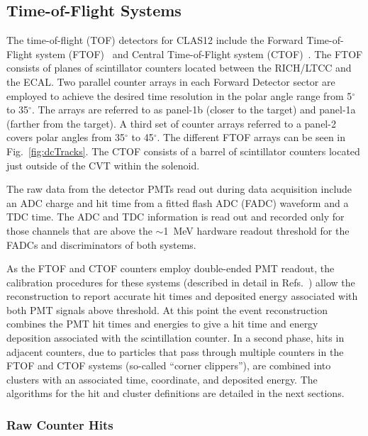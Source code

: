 \subsection{Time-of-Flight Systems}
\label{tof-sys}

The time-of-flight (TOF) detectors for CLAS12 include the Forward Time-of-Flight system (FTOF)~\cite{ftof-nim}
and Central Time-of-Flight system (CTOF)~\cite{ctof-nim}. The FTOF consists of planes of scintillator counters
located between the RICH/LTCC and the ECAL. Two parallel counter arrays in each Forward Detector sector are
employed to achieve the desired time resolution in the polar angle range from 5$^\circ$ to 35$^\circ$. The arrays are
referred to as panel-1b (closer to the target) and panel-1a (farther from the target). A third set of counter arrays
referred to a panel-2 covers polar angles from 35$^\circ$ to 45$^\circ$. The different FTOF arrays can be seen in
Fig.~\ref{fig:dcTracks}. The CTOF consists of a barrel of scintillator counters located just outside of the CVT within
the solenoid.

The raw data from the detector PMTs read out during data acquisition include an ADC charge and hit time from a
fitted flash ADC (FADC) waveform and a TDC time. The ADC and TDC information is read out and recorded only for
those channels that are above the $\sim$1~MeV hardware readout threshold for the FADCs and discriminators of
both systems. 

As the FTOF and CTOF counters employ double-ended PMT readout, the calibration procedures for these
systems (described in detail in Refs.~\cite{ftof-nim,ctof-nim}) allow the reconstruction to report accurate hit
times and deposited energy associated with both PMT signals above threshold. At this point the event reconstruction
combines the PMT hit times and energies to give a hit time and energy deposition associated with the scintillation
counter. In a second phase, hits in adjacent counters, due to particles that pass through multiple counters in the
FTOF and CTOF systems (so-called ``corner clippers''), are combined into clusters with an associated time,
coordinate, and deposited energy. The algorithms for the hit and cluster definitions are detailed in the next sections.

\subsubsection{Raw Counter Hits}

